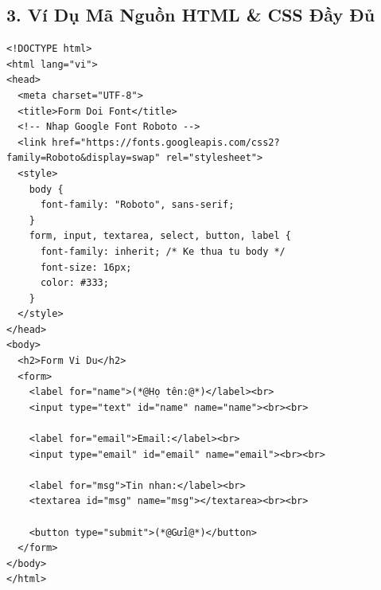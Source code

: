 \documentclass[11pt,oneside]{book}
\newcommand{\thd}[1]{\textcolor{white}{\textbf{\strut #1}}}
\newcommand{\codeinline}[1]{\textcolor{accentOrange}{\texttt{#1}}}
\begin{document}
\begin{prettyTableBox}
\end{prettyTableBox}

\subsection{3. Ví Dụ Mã Nguồn HTML \& CSS Đầy Đủ}

\begin{codeWindow}
\begin{lstlisting}[language=HTML5]
<!DOCTYPE html>
<html lang="vi">
<head>
  <meta charset="UTF-8">
  <title>Form Doi Font</title>
  <!-- Nhap Google Font Roboto -->
  <link href="https://fonts.googleapis.com/css2?family=Roboto&display=swap" rel="stylesheet">
  <style>
    body {
      font-family: "Roboto", sans-serif;
    }
    form, input, textarea, select, button, label {
      font-family: inherit; /* Ke thua tu body */
      font-size: 16px;
      color: #333;
    }
  </style>
</head>
<body>
  <h2>Form Vi Du</h2>
  <form>
    <label for="name">(*@Họ tên:@*)</label><br>
    <input type="text" id="name" name="name"><br><br>
    
    <label for="email">Email:</label><br>
    <input type="email" id="email" name="email"><br><br>
    
    <label for="msg">Tin nhan:</label><br>
    <textarea id="msg" name="msg"></textarea><br><br>
    
    <button type="submit">(*@Gửi@*)</button>
  </form>
</body>
</html>
\end{lstlisting}
\end{codeWindow}
\end{document}

